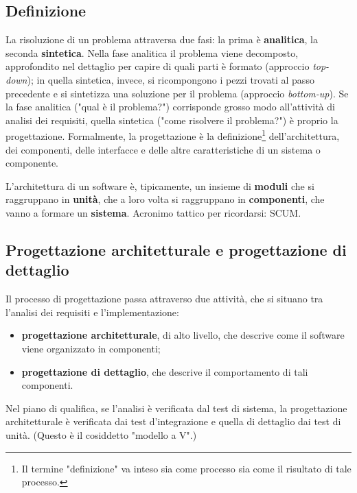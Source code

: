 \documentclass[a4paper]{article}
\begin{document}
		
	\subsection{Definizione}

		
La risoluzione di un problema attraversa due fasi: la prima è \textbf{analitica}, la seconda \textbf{sintetica}. Nella fase analitica il problema viene decomposto, approfondito nel dettaglio per capire di quali parti è formato (approccio \emph{top-down}); in quella sintetica, invece, si ricompongono i pezzi trovati al passo precedente e si sintetizza una soluzione per il problema (approccio \emph{bottom-up}). Se la fase analitica ("qual è il problema?") corrisponde grosso modo all'attività di analisi dei requisiti, quella sintetica ("come risolvere il problema?") è proprio la progettazione. Formalmente, la progettazione è la definizione\footnote{Il termine "definizione" va inteso sia come processo sia come il risultato di tale processo.} dell'architettura, dei componenti, delle interfacce e delle altre caratteristiche di un sistema o componente.
		
L'architettura di un software è, tipicamente, un insieme di \textbf{moduli} che si raggruppano in \textbf{unità}, che a loro volta si raggruppano in \textbf{componenti}, che vanno a formare un \textbf{sistema}. Acronimo tattico per ricordarsi: SCUM.

		
	\subsection{Progettazione architetturale e progettazione di dettaglio}

		
Il processo di progettazione passa attraverso due attività, che si situano tra l'analisi dei requisiti e l'implementazione:
		
	\begin{itemize}
		
			
	\item \textbf{progettazione architetturale}, di alto livello, che descrive come il software viene organizzato in componenti;
			
	\item \textbf{progettazione di dettaglio}, che descrive il comportamento di tali componenti.
		
	\end{itemize}

		
Nel piano di qualifica, se l'analisi è verificata dal test di sistema, la progettazione architetturale è verificata dai test d'integrazione e quella di dettaglio dai test di unità. (Questo è il cosiddetto "modello a V".)
\end{document}
